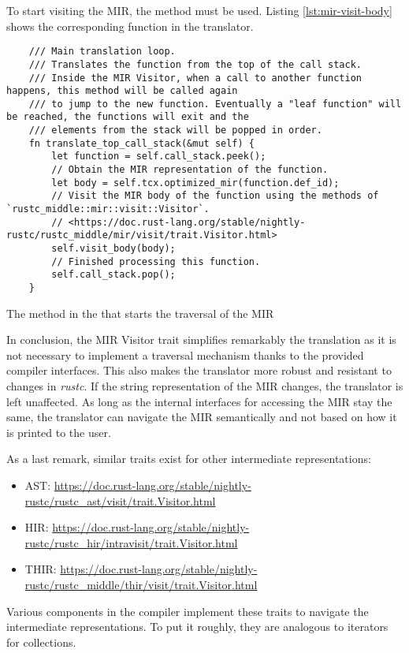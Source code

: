 To start visiting the MIR, the method  must be used.
Listing \ref{lst:mir-visit-body} shows the corresponding function in the translator.

\begin{listing}[!htb]
  \begin{verbatim}
    /// Main translation loop.
    /// Translates the function from the top of the call stack.
    /// Inside the MIR Visitor, when a call to another function happens, this method will be called again
    /// to jump to the new function. Eventually a "leaf function" will be reached, the functions will exit and the
    /// elements from the stack will be popped in order.
    fn translate_top_call_stack(&mut self) {
        let function = self.call_stack.peek();
        // Obtain the MIR representation of the function.
        let body = self.tcx.optimized_mir(function.def_id);
        // Visit the MIR body of the function using the methods of `rustc_middle::mir::visit::Visitor`.
        // <https://doc.rust-lang.org/stable/nightly-rustc/rustc_middle/mir/visit/trait.Visitor.html>
        self.visit_body(body);
        // Finished processing this function.
        self.call_stack.pop();
    }    
  \end{verbatim}
  \caption{The method in the  that starts the traversal of the \acrshort{MIR}}
  \label{lst:mir-visit-body}
\end{listing}

In conclusion, the \acrshort{MIR} Visitor trait simplifies remarkably the translation
as it is not necessary to implement a traversal mechanism thanks to the provided
compiler interfaces.
This also makes the translator more robust and resistant to changes in \emph{rustc}.
If the string representation of the \acrshort{MIR} changes, the translator is left unaffected.
As long as the internal interfaces for accessing the \acrshort{MIR} stay the same,
the translator can navigate the \acrshort{MIR} semantically and not based on how it is printed to the user.

As a last remark, similar traits exist for other intermediate representations:

\begin{itemize}
  \item \acrshort{AST}: \url{https://doc.rust-lang.org/stable/nightly-rustc/rustc_ast/visit/trait.Visitor.html}
  \item \acrshort{HIR}: \url{https://doc.rust-lang.org/stable/nightly-rustc/rustc_hir/intravisit/trait.Visitor.html}
  \item \acrshort{THIR}: \url{https://doc.rust-lang.org/stable/nightly-rustc/rustc_middle/thir/visit/trait.Visitor.html}
\end{itemize}

Various components in the compiler implement these traits
to navigate the intermediate representations.
To put it roughly, they are analogous to iterators for collections.